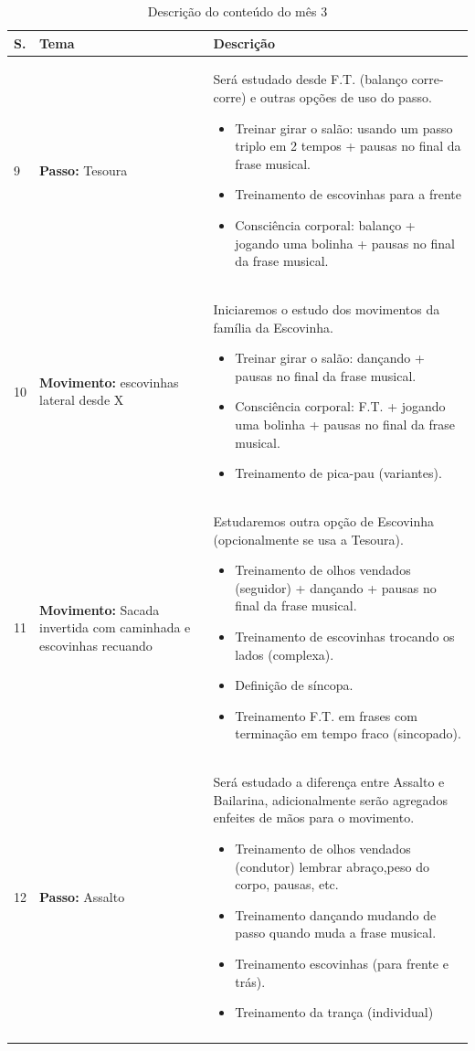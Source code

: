 \documentclass[12pt, a4paper]{article}
\begin{document}
\begin{longtable}{|p{0.5cm}|p{3.0cm}|p{12.0cm}|}
\hline
S. & Tema & Descrição \\  \hline \hline
9 &  \textbf{Passo:} Tesoura & Será estudado desde F.T. (balanço corre-corre) e outras opções de uso do passo.
        \begin{itemize}
        \item Treinar girar o salão: usando um passo triplo em 2 tempos + pausas no final da frase musical.
        \item Treinamento de escovinhas para a frente
        \item Consciência corporal: balanço + jogando uma bolinha + pausas no final da frase musical.
        \end{itemize}
        \\ \hline 
10&  \textbf{Movimento:} escovinhas lateral desde X & Iniciaremos o estudo dos movimentos da família da Escovinha.
        \begin{itemize}
        \item Treinar girar o salão: dançando + pausas no final da frase musical.
        \item Consciência corporal: F.T. + jogando uma bolinha + pausas no final da frase musical.
        \item Treinamento de pica-pau (variantes).
        \end{itemize}
        \\ \hline 
11&  \textbf{Movimento:} Sacada invertida com caminhada e escovinhas recuando & Estudaremos outra opção de Escovinha (opcionalmente se usa a Tesoura). 
        \begin{itemize}
        \item Treinamento de olhos vendados (seguidor) + dançando + pausas no final da frase musical.
        \item Treinamento de escovinhas trocando os lados (complexa).
        \item Definição de síncopa.
        \item Treinamento F.T. em frases com terminação em tempo fraco (sincopado).
        \end{itemize}
        \\ \hline 
12&  \textbf{Passo:} Assalto & Será estudado a diferença entre Assalto e Bailarina, adicionalmente serão agregados enfeites de mãos para o movimento. 
        \begin{itemize}
        \item Treinamento de olhos vendados (condutor) lembrar abraço,peso do corpo, pausas, etc.
        \item Treinamento dançando mudando de passo quando muda a frase musical.
        \item Treinamento escovinhas (para frente e trás).
        \item Treinamento da trança (individual)
        \end{itemize}
        \\ \hline
\caption{Descrição do conteúdo do mês 3}
\label{tab:myfirsttable3}
\end{longtable}
\end{document}

